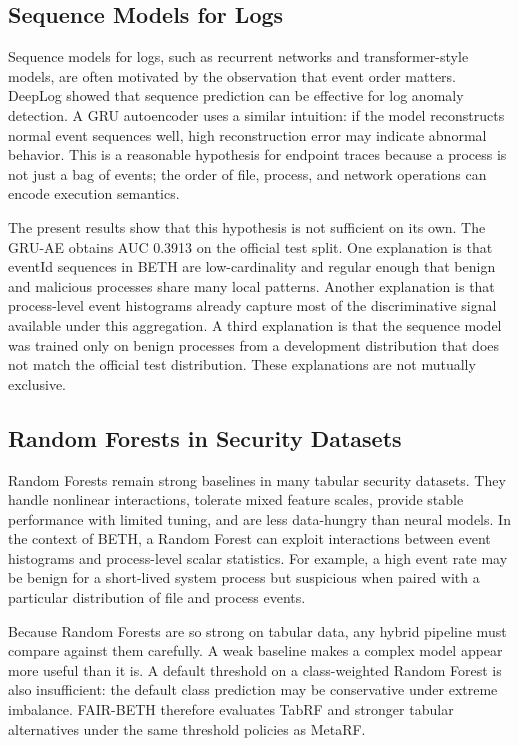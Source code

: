 \documentclass[10pt,journal,compsoc]{IEEEtran}
\begin{document}
\subsection{Sequence Models for Logs}

Sequence models for logs, such as recurrent networks and transformer-style models, are often motivated by the observation that event order matters. DeepLog \cite{du2017} showed that sequence prediction can be effective for log anomaly detection. A GRU autoencoder uses a similar intuition: if the model reconstructs normal event sequences well, high reconstruction error may indicate abnormal behavior. This is a reasonable hypothesis for endpoint traces because a process is not just a bag of events; the order of file, process, and network operations can encode execution semantics.

The present results show that this hypothesis is not sufficient on its own. The GRU-AE obtains AUC 0.3913 on the official test split. One explanation is that eventId sequences in BETH are low-cardinality and regular enough that benign and malicious processes share many local patterns. Another explanation is that process-level event histograms already capture most of the discriminative signal available under this aggregation. A third explanation is that the sequence model was trained only on benign processes from a development distribution that does not match the official test distribution. These explanations are not mutually exclusive.

\subsection{Random Forests in Security Datasets}

Random Forests \cite{breiman2001} remain strong baselines in many tabular security datasets. They handle nonlinear interactions, tolerate mixed feature scales, provide stable performance with limited tuning, and are less data-hungry than neural models. In the context of BETH, a Random Forest can exploit interactions between event histograms and process-level scalar statistics. For example, a high event rate may be benign for a short-lived system process but suspicious when paired with a particular distribution of file and process events.

Because Random Forests are so strong on tabular data, any hybrid pipeline must compare against them carefully. A weak baseline makes a complex model appear more useful than it is. A default threshold on a class-weighted Random Forest is also insufficient: the default class prediction may be conservative under extreme imbalance. FAIR-BETH therefore evaluates TabRF and stronger tabular alternatives under the same threshold policies as MetaRF.
\end{document}
